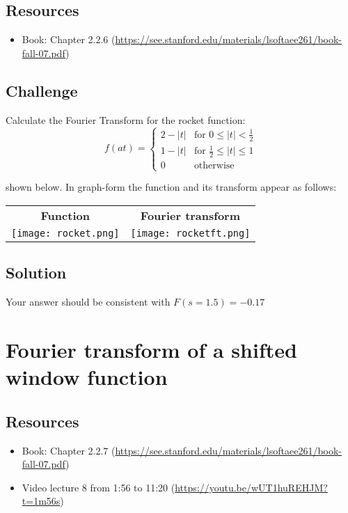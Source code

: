 \subsection*{Resources}
\begin{itemize}
    \item Book: Chapter 2.2.6 (\url{https://see.stanford.edu/materials/lsoftaee261/book-fall-07.pdf})
\end{itemize}

\subsection*{Challenge}
Calculate the Fourier Transform for the rocket function:
\begin{equation}
    f(at)=
    \begin{cases}
        2 - |t| & \text{for } 0 \le |t| < \frac{1}{2}\\
        1 - |t| & \text{for } \frac{1}{2} \le |t| \le 1\\
        0 & \text{otherwise}
    \end{cases}
\end{equation}
    
shown below. In graph-form the function and its transform appear as follows:

\begin{tabular}{cc}
    \textbf{Function} & \textbf{Fourier transform} \\
    \texttt{[image: rocket.png]} & \texttt{[image: rocketft.png]}
\end{tabular}

\subsection*{Solution}
Your answer should be consistent with $F(s=1.5) = -0.17$




\newpage
\section{Fourier transform of a shifted window function}

\subsection*{Resources}
\begin{itemize}
    \item Book: Chapter 2.2.7 (\url{https://see.stanford.edu/materials/lsoftaee261/book-fall-07.pdf})
    \item Video lecture 8 from 1:56 to 11:20 (\url{https://youtu.be/wUT1huREHJM?t=1m56s})
\end{itemize}

